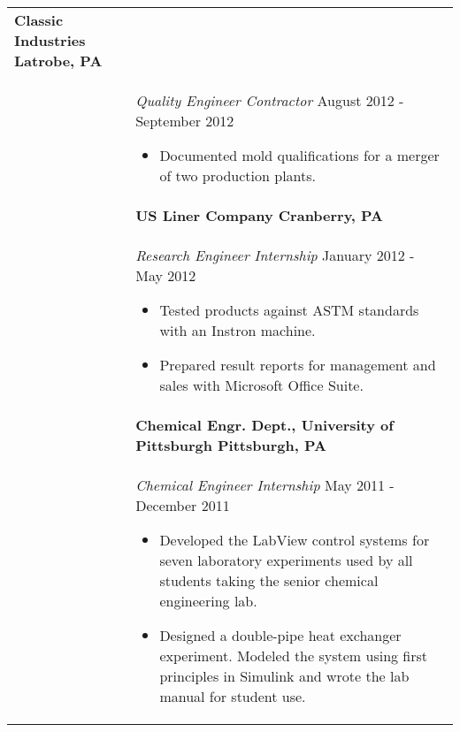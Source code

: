 \documentclass[11pt]{article}
\begin{document}
\begin{tabular}[t]{@{}p{1.15in} @{}p{5.35in}}
		\textbf{Classic Industries  \hfill Latrobe, PA}\vspace{0.015in} \\ &
		{\textit{Quality Engineer Contractor} \hfill August 2012 - September 2012}\vspace{0.015in}
		\begin{itemize}
			\renewcommand{\labelitemi}{$\diamond$}
			\item Documented mold qualifications for a merger of two production plants.
		\end{itemize}
		\\ &


		\textbf{US Liner Company \hfill Cranberry, PA}\vspace{0.015in} \\ &
		\textit{Research Engineer Internship} \hfill January 2012 - May 2012\vspace{0.0175in}
		\begin{itemize}
			\renewcommand{\labelitemi}{$\diamond$}
			\item Tested products against ASTM standards with an Instron machine.
			\item Prepared result reports for management and sales with Microsoft Office Suite. 
		\end{itemize} \\ &



		\textbf{Chemical Engr. Dept., University of Pittsburgh  \hfill Pittsburgh, PA}\vspace{0.015in} \\ &
		{\textit{Chemical Engineer Internship} \hfill May 2011 - December 2011}\vspace{0.015in}
		\begin{itemize}
			\renewcommand{\labelitemi}{$\diamond$}			
			\item Developed the LabView control systems for seven laboratory experiments used by all students taking the senior chemical engineering lab.
			\item Designed a double-pipe heat exchanger experiment.  Modeled the system using first principles in Simulink and wrote the lab manual for student use.
		\end{itemize} \\

		


\end{tabular}
\end{document}
